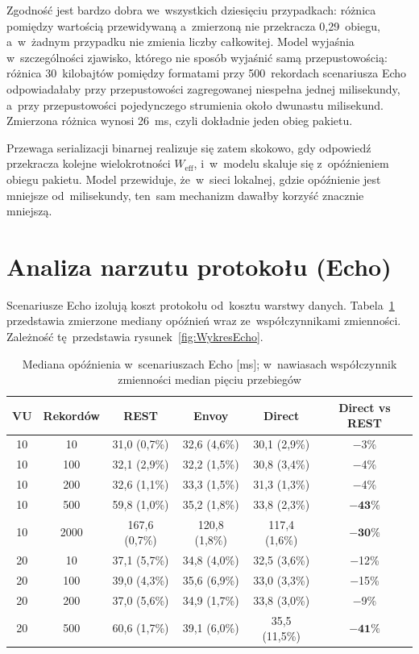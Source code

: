 Zgodność jest bardzo dobra we~wszystkich dziesięciu przypadkach: różnica pomiędzy wartością przewidywaną a~zmierzoną nie przekracza 0,29~obiegu, a~w~żadnym przypadku nie zmienia liczby całkowitej. Model wyjaśnia w~szczególności zjawisko, którego nie sposób wyjaśnić samą przepustowością: różnica 30~kilobajtów pomiędzy formatami przy 500~rekordach scenariusza Echo odpowiadałaby przy przepustowości zagregowanej niespełna jednej milisekundy, a~przy przepustowości pojedynczego strumienia około dwunastu milisekund. Zmierzona różnica wynosi 26~ms, czyli dokładnie jeden obieg pakietu.

Przewaga serializacji binarnej realizuje się zatem skokowo, gdy odpowiedź przekracza kolejne wielokrotności $W_{\mathrm{eff}}$, i~w~modelu skaluje się z~opóźnieniem obiegu pakietu. Model przewiduje, że~w~sieci lokalnej, gdzie opóźnienie jest mniejsze od~milisekundy, ten~sam mechanizm dawałby korzyść znacznie mniejszą.

\section{Analiza narzutu protokołu (Echo)}
\label{sec:AnalizaEcho}

Scenariusze Echo izolują koszt protokołu od~kosztu warstwy danych. Tabela~\ref{tab:EchoLatency} przedstawia zmierzone mediany opóźnień wraz ze~współczynnikami zmienności. Zależność tę~przedstawia rysunek~\ref{fig:WykresEcho}.

\begin{table}[htb]
\centering
\footnotesize
\caption{Mediana opóźnienia w~scenariuszach Echo [ms]; w~nawiasach współczynnik zmienności median pięciu przebiegów}
\label{tab:EchoLatency}
\begin{tabular}{|c|c|c|c|c|c|}
\hline
\textbf{VU} & \textbf{Rekordów} & \textbf{REST} & \textbf{Envoy} & \textbf{Direct} & \textbf{Direct vs REST} \\
\hline
10 & 10   & 31,0 (0,7\%) & 32,6 (4,6\%) & 30,1 (2,9\%) & $-$3\% \\
10 & 100  & 32,1 (2,9\%) & 32,2 (1,5\%) & 30,8 (3,4\%) & $-$4\% \\
10 & 200  & 32,6 (1,1\%) & 33,3 (1,5\%) & 31,3 (1,3\%) & $-$4\% \\
10 & 500  & 59,8 (1,0\%) & 35,2 (1,8\%) & 33,8 (2,3\%) & $\mathbf{-43\%}$ \\
10 & 2000 & 167,6 (0,7\%) & 120,8 (1,8\%) & 117,4 (1,6\%) & $\mathbf{-30\%}$ \\
\hline
20 & 10   & 37,1 (5,7\%) & 34,8 (4,0\%) & 32,5 (3,6\%) & $-$12\% \\
20 & 100  & 39,0 (4,3\%) & 35,6 (6,9\%) & 33,0 (3,3\%) & $-$15\% \\
20 & 200  & 37,0 (5,6\%) & 34,9 (1,7\%) & 33,8 (3,0\%) & $-$9\% \\
20 & 500  & 60,6 (1,7\%) & 39,1 (6,0\%) & 35,5 (11,5\%) & $\mathbf{-41\%}$ \\
\hline
\end{tabular}
\end{table}

